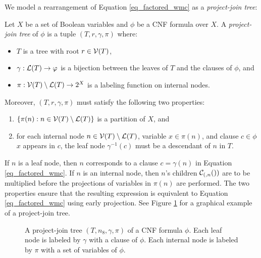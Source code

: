 We model a rearrangement of Equation \eqref{eq_factored_wmc} as a \emph{project-join tree}:
\begin{definition}
\label{def_jointree}
    Let $X$ be a set of Boolean variables and $\phi$ be a CNF formula over $X$.
    A \emph{project-join tree} of $\phi$ is a tuple $(T, r, \gamma, \pi)$ where:
    \begin{itemize}
        \item $T$ is a tree with root $r \in \mathcal{V}(T)$,
        \item $\gamma: \mathcal{L}(T) \to \varphi$ is a bijection between the leaves of $T$ and the clauses of $\phi$, and
        \item $\pi: \mathcal{V}(T) \setminus \mathcal{L}(T) \to 2^X$ is a labeling function on internal nodes.
    \end{itemize}
    Moreover, $(T, r, \gamma, \pi)$ must satisfy the following two properties:
    \begin{enumerate}[ref=\arabic*]
        \item $\{\pi(n) : n \in \mathcal{V}(T) \setminus \mathcal{L}(T) \}$ is a partition of $X$, and \label{prop1}
        \item for each internal node $n \in \mathcal{V}(T) \setminus \mathcal{L}(T)$, variable $x \in \pi(n)$, and clause $c \in \phi$ \st{} $x$ appears in $c$, the leaf node $\gamma^{-1}(c)$ must be a descendant of $n$ in $T$. \label{prop2}
    \end{enumerate}
\end{definition}
If $n$ is a leaf node, then $n$ corresponds to a clause $c = \gamma(n)$ in Equation \eqref{eq_factored_wmc}.
If $n$ is an internal node, then $n$'s children $\mathcal{C}_{(,n}())$ are to be multiplied before the projections of variables in $\pi(n)$ are performed.
The two properties ensure that the resulting expression is equivalent to Equation \eqref{eq_factored_wmc} using early projection.
See Figure \ref{fig_join_tree} for a graphical example of a project-join tree.
\begin{figure}%
    \centering
\caption{
    A project-join tree $(T, n_{8}, \gamma, \pi)$ of a CNF formula $\phi$.
    Each leaf node is labeled by $\gamma$ with a clause of $\phi$.
    Each internal node is labeled by $\pi$ with a set of variables of $\phi$.
}
\label{fig_join_tree}
\end{figure}


